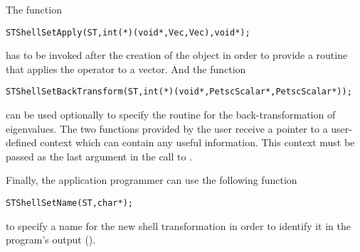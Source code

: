 	The function
	\begin{Verbatim}[fontsize=\small]
      STShellSetApply(ST,int(*)(void*,Vec,Vec),void*);
	\end{Verbatim}
has to be invoked after the creation of the  object in order to provide a routine that applies the operator to a vector. And the function
	\begin{Verbatim}[fontsize=\small]
      STShellSetBackTransform(ST,int(*)(void*,PetscScalar*,PetscScalar*));
	\end{Verbatim}
can be used optionally to specify the routine for the back-transformation of eigenvalues. The two functions provided by the user receive a pointer to a user-defined context which can contain any useful information. This context must be passed as the last argument in the call to .

	Finally, the application programmer can use the following function
	\begin{Verbatim}[fontsize=\small]
      STShellSetName(ST,char*);
	\end{Verbatim}
to specify a name for the new shell transformation in order to identify it in the program's output ().


